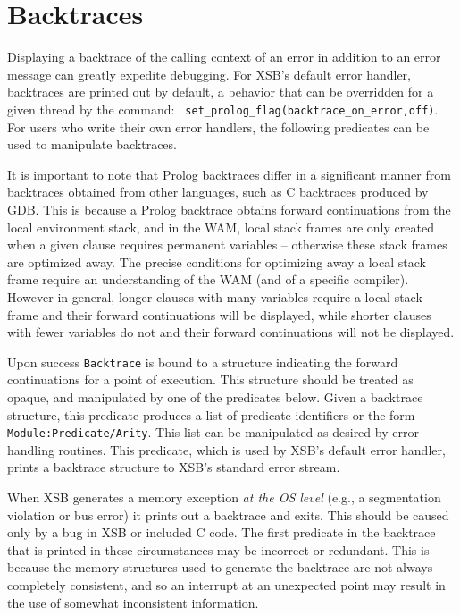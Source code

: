\section{Backtraces}
\label{sec:backtrace}

%
Displaying a backtrace of the calling context of an error in addition
to an error message can greatly expedite debugging.  For XSB's default
error handler, backtraces are printed out by default, a behavior that
can be overridden for a given thread by the command: {\tt
  set\_prolog\_flag(backtrace\_on\_error,off)}.  For users who write
their own error handlers, the following predicates can be used to
manipulate backtraces.

It is important to note that Prolog backtraces differ in a significant
manner from backtraces obtained from other languages, such as C
backtraces produced by GDB.  This is because a Prolog backtrace
obtains forward continuations from the local environment stack, and in
the WAM, local stack frames are only created when a given clause
requires permanent variables -- otherwise these stack frames are
optimized away.  The precise conditions for optimizing away a local
stack frame require an understanding of the WAM (and of a specific
compiler).  However in general, longer clauses with many variables
require a local stack frame and their forward continuations will be
displayed, while shorter clauses with fewer variables do not and their
forward continuations will not be displayed.

\begin{description}
%
Upon success {\tt Backtrace} is bound to a structure indicating the
forward continuations for a point of execution.  This structure should
be treated as opaque, and manipulated by one of the predicates below.
%
%
Given a backtrace structure, this predicate produces a list of
predicate identifiers or the form {\tt Module:Predicate/Arity}.  This
list can be manipulated as desired by error handling routines.
%
%
 This predicate, which is used by XSB's default error handler, prints
 a backtrace structure to XSB's standard error stream.
\end{description}

When XSB generates a memory exception {\em at the OS level} (e.g., a
segmentation violation or bus error) it prints out a backtrace and
exits.  This should be caused only by a bug in XSB or included C code.
The first predicate in the backtrace that is printed in these
circumstances may be incorrect or redundant.  This is because the
memory structures used to generate the backtrace are not always
completely consistent, and so an interrupt at an unexpected point may
result in the use of somewhat inconsistent information.

